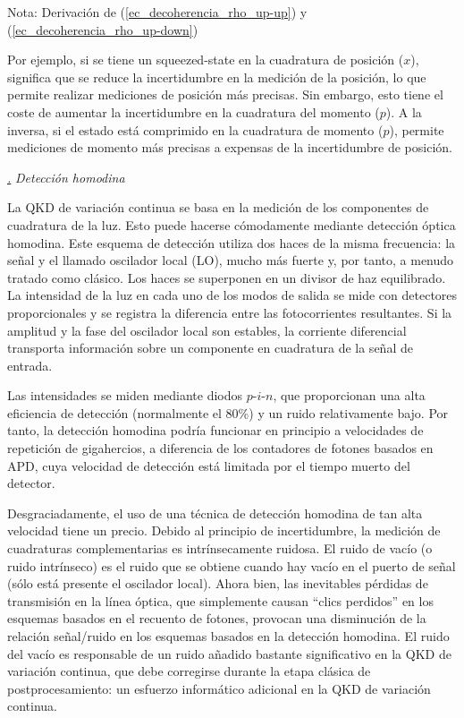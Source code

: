\documentclass[a4paper,11pt]{book} %
\numberwithin{equation}{chapter}
\def\subsubiContadorIt{\par\addtocounter{subsubsection}{1}\underline{\it\thesubsubsection.}\hskip0.5cm \setcounter{subsubsubsectionIt}{0}}
\newcommand{\SubsubiIt}[1]{
		\subsubiContadorIt \textit{#1}
	}
\newcounter{subsubsubsectionIt}[subsubsection]
\begin{document}
\begin{mybox_blue}{Nota: Derivación de (\ref{ec_decoherencia_rho_up-up}) y  (\ref{ec_decoherencia_rho_up-down})}
\begin{enumerate}
\end{enumerate}

Por ejemplo, si se tiene un squeezed-state en la cuadratura de posición ($x$), significa que se reduce la incertidumbre en la medición de la posición, lo que permite realizar mediciones de posición más precisas. Sin embargo, esto tiene el coste de aumentar la incertidumbre en la cuadratura del momento ($p$). A la inversa, si el estado está comprimido en la cuadratura de momento ($p$), permite mediciones de momento más precisas a expensas de la incertidumbre de posición.


		\SubsubiIt{Detección homodina}

La QKD de variación continua se basa en la medición de los componentes de cuadratura de la luz. Esto puede hacerse cómodamente mediante detección óptica homodina. Este esquema de detección utiliza dos haces de la misma frecuencia: la señal y el llamado oscilador local (LO), mucho más fuerte y, por tanto, a menudo tratado como clásico. Los haces se superponen en un divisor de haz equilibrado. La intensidad de la luz en cada uno de los modos de salida se mide con detectores proporcionales y se registra la diferencia entre las fotocorrientes resultantes. Si la amplitud y la fase del oscilador local son estables, la corriente diferencial transporta información sobre un componente en cuadratura de la señal de entrada. 

Las intensidades se miden mediante diodos $p$-$i$-$n$, que proporcionan una alta eficiencia de detección (normalmente el 80\%) y un ruido relativamente bajo. Por tanto, la detección homodina podría funcionar en principio a velocidades de repetición de gigahercios, a diferencia de los contadores de fotones basados en APD, cuya velocidad de detección está limitada por el tiempo muerto del detector.

Desgraciadamente, el uso de una técnica de detección homodina de tan alta velocidad tiene un precio. Debido al principio de incertidumbre, la medición de cuadraturas complementarias es intrínsecamente ruidosa. El ruido de vacío (o ruido intrínseco) es el ruido que se obtiene cuando hay vacío en el puerto de señal (sólo está presente el oscilador local). Ahora bien, las inevitables pérdidas de transmisión en la línea óptica, que simplemente causan ``clics perdidos'' en los esquemas basados en el recuento de fotones, provocan una disminución de la relación señal/ruido en los esquemas basados en la detección homodina. El ruido del vacío es responsable de un ruido añadido bastante significativo en la QKD de variación continua, que debe corregirse durante la etapa clásica de postprocesamiento: un esfuerzo informático adicional en la QKD de variación continua.



\end{mybox_blue}
\end{document}
